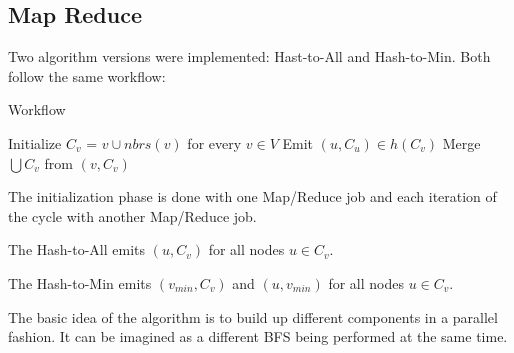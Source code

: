 \subsection{Map Reduce}

Two algorithm versions were implemented: Hast-to-All and Hash-to-Min. Both follow the same workflow:

\begin{algorithm}
\caption{Workflow}
\label{algo:workflow}
\begin{algorithmic}[1]
\State Initialize $C_{v}$ = ${v} \cup nbrs(v)$ for every $v \in V$
\Repeat
\State Emit $(u, C_u) \in h(C_ v)$
\State Merge $\bigcup C_v$ from $(v, C_v)$
\end{algorithmic}
\end{algorithm}

The initialization phase is done with one Map/Reduce job and each iteration of the cycle with another Map/Reduce job.

The Hash-to-All emits $(u, C_v)$ for all nodes $u \in C_v$.

The Hash-to-Min emits $(v_{min}, C_v)$ and $(u, v_{min})$ for all nodes $u \in C_v$.

The basic idea of the algorithm is to build up different components in a parallel fashion. It can be imagined as a different BFS being performed at the same time.

